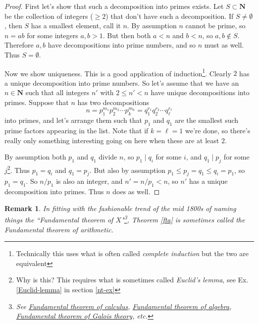 \documentclass[12pt]{article}
\numberwithin{equation}{subsection}
\theoremstyle{note}
\newtheorem{remark}[subsection]{Remark}
\begin{document}
\begin{proof} First let's show that such a decomposition into primes exists. Let $S\subset \mathbf{N}$ be the collection of integers ($\geq 2$) that don't have such a decomposition. If $S\neq \emptyset$, then $S$ has a smallest element, call it $n$. By assumption $n$ cannot be prime, so $n=ab$ for some integers $a,b>1$. But then both $a<n$ and $b<n$, so $a,b\notin S$. Therefore $a,b$ have decompositions into prime numbers, and so $n$ must as well. Thus $S=\emptyset$. 

Now we show uniqueness. This is a good application of induction\footnote{Technically this uses what is often called \textit{complete induction} but the two are equivalent}. Clearly $2$ has a unique decomposition into prime numbers. So let's assume that we have an $n\in\mathbf{N}$ such that all integers $n'$ with $2\leq n'<n$ have unique decompositions into primes. Suppose that $n$ has two decompositions \[ n=p_1^{m_1}p_2^{m_2}\cdots p_k^{m_k}=q_1^{r_1}q_2^{r_2}\cdots q_{\ell}^{r_{\ell}}\] into primes, and let's arrange them such that $p_1$ and $q_1$ are the smallest such prime factors appearing in the list. Note that if $k=\ell=1$ we're done, so there's really only something interesting going on here when these are at least $2$.  

By assumption both $p_1$ and $q_1$ divide $n$, so $p_1\mid q_i$ for some $i$, and $q_1\mid p_j$ for some $j$\footnote{Why is this? This requires what is sometimes called \textit{Euclid's lemma}, see Ex. \ref{Euclid-lemma} in section \ref{nt-ex}}. Thus $p_1=q_i$ and $q_1=p_j$. But also by assumption $p_1\leq p_j =q_1\leq q_i=p_1$, so $p_1=q_1$. So $n/p_1$ is also an integer, and $n'=n/p_1<n$, so $n'$ has a unique decomposition into primes. Thus $n$ does as well. 
\end{proof}

\begin{remark}
In fitting with the fashionable trend of the mid 1800s of naming things the ``Fundamental theorem of $X$"\footnote{See \href{https://en.wikipedia.org/wiki/Fundamental_theorem_of_calculus}{Fundamental theorem of calculus}, \href{https://en.wikipedia.org/wiki/Fundamental_theorem_of_algebra}{Fundamental theorem of algebra}, \href{https://en.wikipedia.org/wiki/Fundamental_theorem_of_Galois_theory}{Fundamental theorem of Galois theory}, etc.}, Theorem \ref{fta} is sometimes called the \textit{Fundamental theorem of arithmetic}.

\end{remark}
\end{document}
